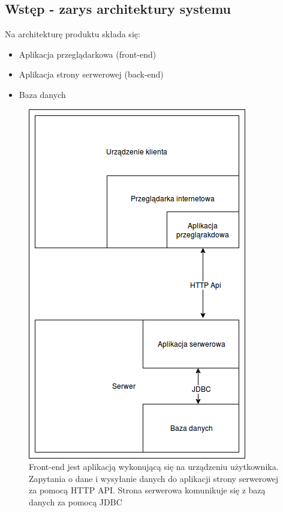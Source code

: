 \documentclass[polish,12pt]{aghthesis}
\begin{document}
\subsection{Wstęp - zarys architektury systemu}
Na architekturę produktu składa się:
\begin{itemize}
    \item Aplikacja przeglądarkowa (front-end)
    \item Aplikacja strony serwerowej (back-end)
    \item Baza danych
\end{itemize}


\begin{figure}[H]
    \centering
    \includegraphics{komunikacja-serwer-klient-okolny}
    \caption{Front-end jest aplikacją wykonującą się na urządzeniu użytkownika. Zapytania o dane i wysyłanie danych do aplikacji strony serwerowej za pomocą HTTP API. Strona serwerowa komunikuje się z bazą danych za pomocą JDBC}
    \label{fig:my_label}
\end{figure}
\end{document}
